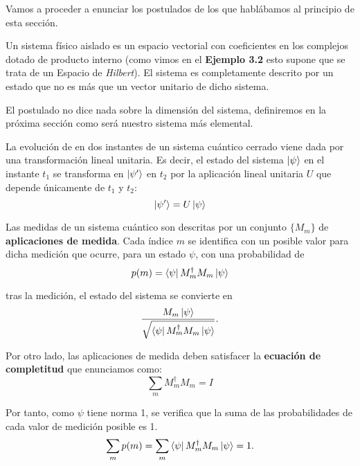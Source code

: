 Vamos a proceder a enunciar los postulados de los que hablábamos al principio de esta sección.

\begin{postulate} Un sistema físico aislado es un espacio vectorial con coeficientes en los complejos dotado de producto interno (como vimos en el \textbf{Ejemplo 3.2} esto supone que se trata de un Espacio de \textit{Hilbert}). El sistema es completamente descrito por un estado que no es más que un vector unitario de dicho sistema.
\end{postulate}

El postulado no dice nada sobre la dimensión del sistema, definiremos en la próxima sección como será nuestro sistema más elemental.

\begin{postulate} La evolución de en dos instantes de un sistema cuántico cerrado viene dada por una transformación lineal unitaria. Es decir, el estado del sistema $\left|\psi\right\rangle$ en el instante $t_1$ se transforma en $\left|\psi'\right\rangle$ en $t_2$ por la aplicación lineal unitaria $U$ que depende únicamente de $t_1$ y $t_2$:
\begin{equation}
\left|\psi'\right\rangle=U\left|\psi\right\rangle
\end{equation}
\end{postulate}

\begin{postulate} Las medidas de un sistema cuántico son descritas por un conjunto $\{M_m \}$ de \textbf{aplicaciones de medida}. Cada índice $m$ se identifica con un posible valor para dicha medición que ocurre, para un estado $\psi$, con una probabilidad de 
\begin{equation}
p(m)=\left\langle\psi\right|M_m^\dag M_m\left|\psi\right\rangle
\end{equation}

tras la medición, el estado del sistema se convierte en
\begin{equation}
\dfrac{M_m\left|\psi\right\rangle}{\sqrt{\left\langle\psi\right|M_m^\dag M_m\left|\psi\right\rangle}}.
\end{equation}

Por otro lado, las aplicaciones de medida deben satisfacer la \textbf{ecuación de completitud} que enunciamos como:
\begin{equation}
\sum_m M_m^\dag M_m = I
\end{equation}

Por tanto, como $\psi$ tiene norma 1, se verifica que la suma de las probabilidades de cada valor de medición posible es 1.
\begin{equation}
\sum_m p(m)=\sum_m \left\langle\psi\right|M_m^\dag M_m\left|\psi\right\rangle = 1.
\end{equation}
\end{postulate}

